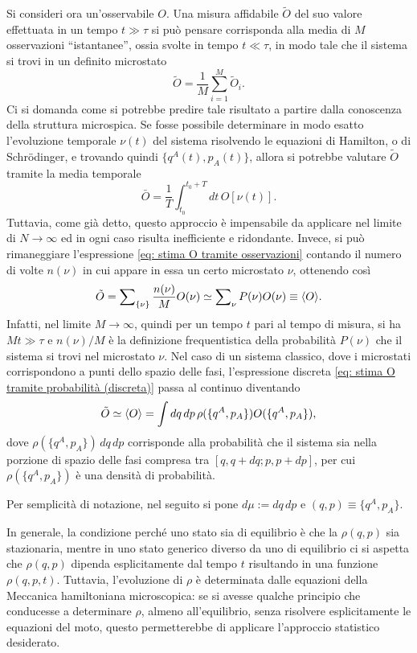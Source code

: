Si consideri ora un'osservabile $O$. Una misura affidabile $\tilde{O}$ del suo valore effettuata in un tempo $t \gg \tau$ si può pensare corrisponda alla media di $M$ osservazioni ``istantanee'', ossia svolte in tempo $t \ll \tau$, in modo tale che il sistema si trovi in un definito microstato
\begin{equation}
\label{eq: stima O tramite osservazioni}
    \tilde{O} = \frac{1}{M}\sum_{i = 1}^M \tilde{O}_i.
\end{equation}
Ci si domanda come si potrebbe predire tale risultato a partire dalla conoscenza della struttura microspica. Se fosse possibile determinare in modo esatto l'evoluzione temporale $\nu(t)$ del sistema risolvendo le equazioni di Hamilton, o di Schr\"odinger, e trovando quindi $\{q^A(t),p_A(t)\}$, allora si potrebbe valutare $\tilde{O}$ tramite la media temporale 
\begin{equation}
\label{eq: stima O tramite media temporale}
    \bar{O} = \frac{1}{T}\int_{t_0}^{t_0 + T}dt\,O[\nu(t)].
\end{equation}
Tuttavia, come già detto, questo approccio è impensabile da applicare nel limite di $N\to\infty$ ed in ogni caso risulta inefficiente e ridondante. Invece, si può rimaneggiare l'espressione \eqref{eq: stima O tramite osservazioni} contando il numero di volte $n(\nu)$ in cui appare in essa un certo microstato $\nu$, ottenendo così
\begin{equation}
\label{eq: stima O tramite probabilità (discreta)}
    \tilde{O} = \sum\nolimits_{\{\nu\}}\frac{n(\nu)}{M}O(\nu) \simeq \sum\nolimits_\nu P(\nu)O(\nu) \equiv \langle O \rangle.
\end{equation}
Infatti, nel limite $M\to\infty$, quindi per un tempo $t$ pari al tempo di misura, si ha $Mt \gg \tau$ e $n(\nu)/M$ è la definizione frequentistica della probabilità $P(\nu)$ che il sistema si trovi nel microstato $\nu$. Nel caso di un sistema classico, dove i microstati corrispondono a punti dello spazio delle fasi, l'espressione discreta \eqref{eq: stima O tramite probabilità (discreta)} passa al continuo diventando
\begin{equation}
\label{eq: stima O tramite probabilità (continua)}
    \tilde{O} \simeq \langle O \rangle = \int dq\,dp\,\rho(\{q^A,p_A\})O(\{q^A,p_A\}),
\end{equation}
dove $\rho(\{q^A,p_A\})\,dq\,dp$ corrisponde alla probabilità che il sistema sia nella porzione di spazio delle fasi compresa tra $[q,q+dq;p,p+dp]$, per cui $\rho(\{q^A,p_A\})$ è una densità di probabilità. 
\begin{notz}
    Per semplicità di notazione, nel seguito si pone $d\mu := dq\,dp$ e $(q,p) \equiv \{q^A,p_A\}$.
\end{notz}
In generale, la condizione perché uno stato sia di equilibrio è che la $\rho(q,p)$ sia stazionaria, mentre in uno stato generico diverso da uno di equilibrio ci si aspetta che $\rho(q,p)$ dipenda esplicitamente dal tempo $t$ risultando in una funzione $\rho(q,p,t)$. Tuttavia, l'evoluzione di $\rho$ è determinata dalle equazioni della Meccanica hamiltoniana microscopica: se si avesse qualche principio che conducesse a determinare $\rho$, almeno all'equilibrio, senza risolvere esplicitamente le equazioni del moto, questo permetterebbe di applicare l'approccio statistico desiderato. 

